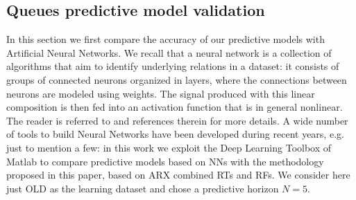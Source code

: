 
\subsection{Queues predictive model validation}

In this section we first compare the accuracy of our predictive models with Artificial Neural Networks. We recall that a neural network is a collection of algorithms that aim to identify underlying relations in a dataset: it consists of groups of connected neurons organized in layers, where the connections between neurons are modeled using weights. The signal produced with this linear composition is then fed into an activation function that is in general nonlinear. The reader is referred to \cite{NNstateOfART} and references therein for more details. A wide number of tools to build Neural Networks have been developed during recent years, e.g. \cite{tensorflow2015,chollet2015keras,openNN} just to mention a few: in this work we exploit the Deep Learning Toolbox of Matlab to compare predictive models based on NNs with the methodology proposed in this paper, based on ARX combined RTs and RFs. We consider here just OLD as the learning dataset and chose a predictive horizon $N=5$.

